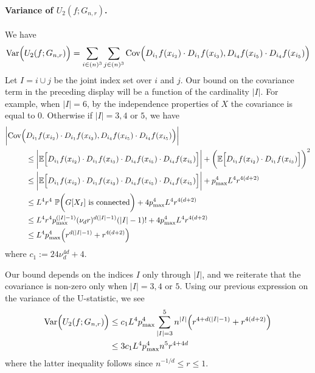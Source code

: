 \documentclass{article}
\newcommand{\abs}[1]{\left \lvert #1 \right \rvert}
\newcommand{\Var}{\mathrm{Var}}
\newcommand{\Cov}{\mathrm{Cov}}
\newcommand{\1}{\mathbf{1}}
\newcommand{\Pbb}{\mathbb{P}}
\newcommand{\Ebb}{\mathbb{E}}
\theoremstyle{alden}
\theoremstyle{aldenthm}
\theoremstyle{definition}
\theoremstyle{remark}
\begin{document}
\paragraph{Variance of $U_2(f;G_{n,r})$.}
We have
\begin{equation*}
\Var\Bigl(U_2(f;G_{n,r})\Bigr) = \sum_{i \in (n)^3} \sum_{j \in (n)^3} \Cov\Bigl(D_{i_1}f(x_{i_2}) \cdot D_{i_1}f(x_{i_3}),D_{i_4}f(x_{i_5})\cdot D_{i_4}f(x_{i_5})\Bigr)
\end{equation*}
Let $I = i \cup j$ be the joint index set over $i$ and $j$. Our bound on the covariance term in the preceding display will be a function of the cardinality $\abs{I}$. For example, when $\abs{I} = 6$, by the independence properties of $X$ the covariance is equal to 0. Otherwise if $\abs{I} = 3,4$ or $5$, we have
\begin{align*}
\biggl|\Cov\Bigl(& D_{i_1}f(x_{i_2}) \cdot D_{i_1}f(x_{i_3}),D_{i_4}f(x_{i_5})\cdot D_{i_4}f(x_{i_5})\Bigr)\biggr| \\
& \leq \biggl|\Ebb\Bigl[D_{i_1}f(x_{i_2}) \cdot D_{i_1}f(x_{i_3}) \cdot D_{i_4}f(x_{i_5})\cdot D_{i_4}f(x_{i_5})\Big]\biggr| + \biggl(\Ebb\Bigl[D_{i_1}f(x_{i_2}) \cdot D_{i_1}f(x_{i_3})\Bigr] \biggr)^2 \\
& \leq \biggl|\Ebb\Bigl[D_{i_1}f(x_{i_2}) \cdot D_{i_1}f(x_{i_3}) \cdot D_{i_4}f(x_{i_5})\cdot D_{i_4}f(x_{i_5})\Big]\biggr| + p_{\max}^4 L^4 r^{4(d + 2)} \\
& \leq L^4 r^4 ~ \Pbb \biggl(G[X_I]~\textrm{is connected}\biggr) + 4 p_{\max}^4 L^4 r^{4(d + 2)} \\
& \leq L^4 r^4 p_{\max}^{(\abs{I} - 1)} (\nu_d r)^{d(\abs{I} - 1)} (\abs{I} - 1)! + 4 p_{\max}^4 L^4 r^{4(d + 2)} \\
& \leq L^4 p_{\max}^4 \Bigl(r^{d(\abs{I} - 1)} + r^{4(d + 2)}\Bigr)
\end{align*}
where $c_1 := 24 \nu_d^{4d} + 4$.

Our bound depends on the indices $I$ only through $\abs{I}$, and we reiterate that the covariance is non-zero only when $\abs{I} = 3,4$ or $5$. Using our previous expression on the variance of the U-statistic, we see
\begin{align*}
\Var\Bigl(U_2(f;G_{n,r})\Bigr) & \leq c_1 L^4 p_{\max}^4 \sum_{\abs{I} = 3}^{5} n^{\abs{I}} \Bigl( r^{4 + d(\abs{I} - 1)} + r^{4(d + 2)} \Bigr) \\
& \leq 3 c_1 L^4 p_{\max}^4 n^{5} r^{4 + 4d}
\end{align*}
where the latter inequality follows since $n^{-1/d} \leq r \leq 1$.
\end{document}

